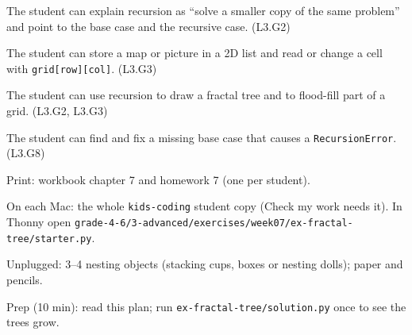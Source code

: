 
\begin{objectives}
  \item The student can explain recursion as \enquote{solve a smaller copy of the same problem} and point to the base case and the recursive case. (L3.G2)
  \item The student can store a map or picture in a 2D list and read or change a cell with \texttt{grid[row][col]}. (L3.G3)
  \item The student can use recursion to draw a fractal tree and to flood-fill part of a grid. (L3.G2, L3.G3)
  \item The student can find and fix a missing base case that causes a \texttt{RecursionError}. (L3.G8)
\end{objectives}

\begin{materials}
  \item Print: workbook chapter 7 and homework 7 (one per student).
  \item On each Mac: the whole \texttt{kids-coding} student copy (Check my work needs it). In Thonny open \texttt{grade-4-6/3-advanced/exercises/week07/ex-fractal-tree/starter.py}.
  \item Unplugged: 3--4 nesting objects (stacking cups, boxes or nesting dolls); paper and pencils.
  \item Prep (10 min): read this plan; run \texttt{ex-fractal-tree/solution.py} once to see the trees grow.
\end{materials}

\begin{timeplan}
\end{timeplan}

